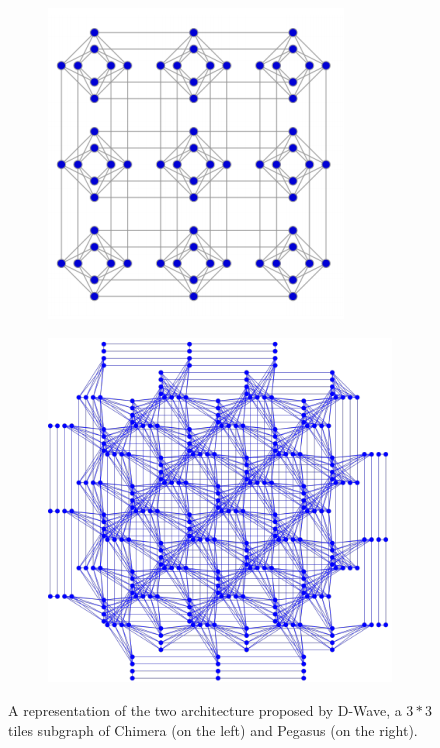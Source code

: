 \begin{figure}[t]
    \begin{subfigure}{.5\textwidth}
        \centering
	    \includegraphics{QATile.PNG}
    \end{subfigure}
    \begin{subfigure}{.5\textwidth}
        \begin{center}
	    \includegraphics[width=\textwidth]{Pegas.PNG}
	    \end{center}
	\end{subfigure}
	\caption{A representation of the two architecture proposed by D-Wave, a $3*3$ tiles subgraph of Chimera (on the left) and Pegasus (on the right).}
\end{figure}
